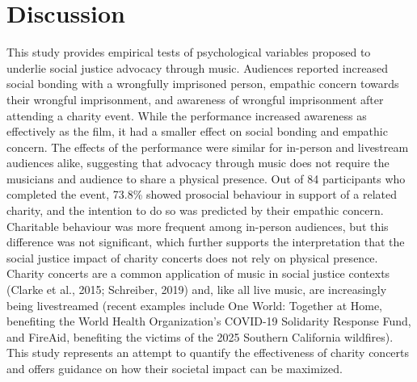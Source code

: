 \documentclass[
  man,floatsintext]{apa6}
\begin{document}
\section{Discussion}\label{discussion}

This study provides empirical tests of psychological variables proposed to underlie social justice advocacy through music. Audiences reported increased social bonding with a wrongfully imprisoned person, empathic concern towards their wrongful imprisonment, and awareness of wrongful imprisonment after attending a charity event. While the performance increased awareness as effectively as the film, it had a smaller effect on social bonding and empathic concern. The effects of the performance were similar for in-person and livestream audiences alike, suggesting that advocacy through music does not require the musicians and audience to share a physical presence. Out of 84 participants who completed the event, 73.8\% showed prosocial behaviour in support of a related charity, and the intention to do so was predicted by their empathic concern. Charitable behaviour was more frequent among in-person audiences, but this difference was not significant, which further supports the interpretation that the social justice impact of charity concerts does not rely on physical presence. Charity concerts are a common application of music in social justice contexts (Clarke et al., 2015; Schreiber, 2019) and, like all live music, are increasingly being livestreamed (recent examples include One World: Together at Home, benefiting the World Health Organization's COVID-19 Solidarity Response Fund, and FireAid, benefiting the victims of the 2025 Southern California wildfires). This study represents an attempt to quantify the effectiveness of charity concerts and offers guidance on how their societal impact can be maximized.
\end{document}
